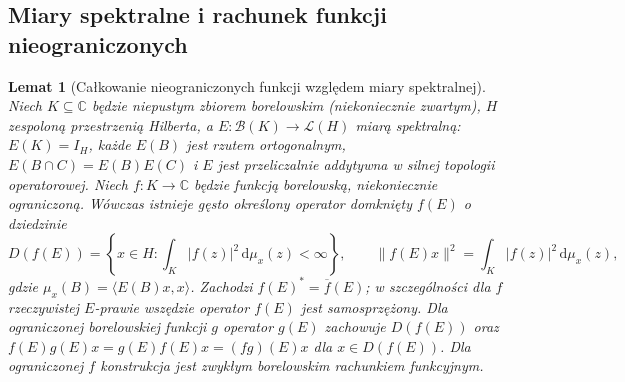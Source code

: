 \documentclass[11pt,a4paper]{article}
\numberwithin{equation}{section}
\theoremstyle{plain}
\newtheorem{lemat}[twierdzenie]{Lemat}
\theoremstyle{definition}
\theoremstyle{remark}
\newcommand{\C}{\mathbb C}
\begin{document}
\subsection{Miary spektralne i rachunek funkcji nieograniczonych}

\begin{lemat}[Całkowanie nieograniczonych funkcji względem miary spektralnej]
\label{lem:unbounded-integral33}
Niech $K\subseteq\C$ będzie niepustym zbiorem borelowskim
(niekoniecznie zwartym), $H$ zespoloną przestrzenią Hilberta,
a $E:\mathcal B(K)\to\mathcal L(H)$ miarą spektralną:
$E(K)=I_H$, każde $E(B)$ jest rzutem ortogonalnym,
$E(B\cap C)=E(B)E(C)$ i $E$ jest przeliczalnie addytywna
w silnej topologii operatorowej. Niech $f:K\to\C$ będzie
funkcją borelowską, niekoniecznie ograniczoną.
Wówczas istnieje gęsto określony operator domknięty $f(E)$
o dziedzinie
\[
 D(f(E))=\left\{x\in H:\int_K|f(z)|^2\,\mathrm d\mu_x(z)<\infty\right\},
 \qquad \|f(E)x\|^2=\int_K|f(z)|^2\,\mathrm d\mu_x(z),
\]
gdzie $\mu_x(B)=\langle E(B)x,x\rangle$.
Zachodzi $f(E)^*=\overline f(E)$; w szczególności dla
$f$ rzeczywistej $E$-prawie wszędzie operator $f(E)$ jest
samosprzężony. Dla ograniczonej borelowskiej funkcji $g$
operator $g(E)$ zachowuje $D(f(E))$ oraz
$f(E)g(E)x=g(E)f(E)x=(fg)(E)x$ dla $x\in D(f(E))$.
Dla ograniczonej $f$ konstrukcja jest zwykłym borelowskim
rachunkiem funkcyjnym.
\end{lemat}
\end{document}
